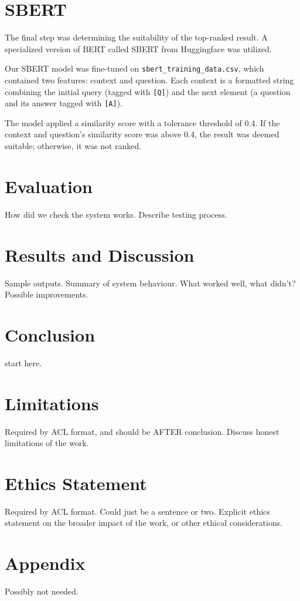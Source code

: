 \documentclass[11pt]{article}
\begin{document}
\section{SBERT}
The final step was determining the suitability of the top-ranked result. A specialized version of BERT called SBERT from Huggingface was utilized.

Our SBERT model was fine-tuned on \texttt{sbert\_training\_data.csv}, which contained two features: context and question. Each context is a formatted string combining the initial query (tagged with \texttt{[Q]}) and the next element (a question and its answer tagged with \texttt{[A]}).

The model applied a similarity score with a tolerance threshold of 0.4. If the context and question's similarity score was above 0.4, the result was deemed suitable; otherwise, it was not ranked.


\cite{Aliannejadi2019}

\section{Evaluation}
How did we check the system works.
Describe testing process.

\section{Results and Discussion}
Sample outputs.
Summary of system behaviour.
What worked well, what didn't?
Possible improvements.

\section{Conclusion}
start here.

\section*{Limitations}
Required by ACL format, and should be AFTER conclusion.
Discuss honest limitations of the work.

\section*{Ethics Statement}
Required by ACL format. Could just be a sentence or two.
Explicit ethics statement on the broader impact of the work, or other ethical considerations.




\appendix

\section{Appendix}
Possibly not needed.
\end{document}
